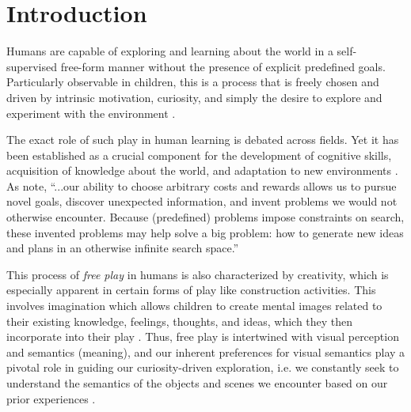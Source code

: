 \chapter{Introduction}
\label{sec:introduction}

Humans are capable of exploring and learning about the world in a self-supervised free-form manner without the presence of explicit predefined goals.
Particularly observable in children, this is a process that is freely chosen and driven by intrinsic motivation, curiosity, and simply the desire to explore and experiment with the environment \citep{seven_play}.

The exact role of such play in human learning is debated across fields.
Yet it has been established as a crucial component for the development of cognitive skills, acquisition of knowledge about the world, and adaptation to new environments \citep{playmontana,playreview}.
As \citet{chu2020play} note, ``...our ability to choose arbitrary costs and rewards allows us to pursue novel goals, discover unexpected information, and invent problems we would not otherwise encounter. Because (predefined) problems impose constraints on search, these invented problems may help solve a big problem: how to generate new ideas and plans in an otherwise infinite search space.''

This process of \emph{free play} in humans is also characterized by creativity, which is especially apparent in certain forms of play like construction activities.
This involves imagination which allows children to create mental images related to their existing knowledge, feelings, thoughts, and ideas, which they then incorporate into their play \citep{learning_though_play}.
Thus, free play is intertwined with visual perception and semantics (meaning), and 
our inherent preferences for visual semantics play a pivotal role in guiding our curiosity-driven exploration, i.e. we constantly seek to understand the semantics of the objects and scenes we encounter based on our prior experiences \citep{exploration}.

